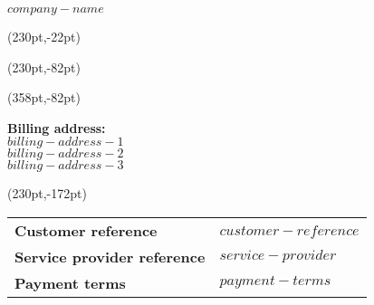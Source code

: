 \documentclass[a4paper,11pt]{article}
\begin{document}
\pagestyle{fancy}
\fancyhf{} %
\renewcommand{\headrulewidth}{0pt}
\renewcommand{\footrulewidth}{0pt}

\setlength{\fboxsep}{1.5em}
\setlength{\parindent}{0pt}

{\huge $company-name$}



\fancyput*(230pt,-22pt){}

\fancyput*(230pt,-82pt){}

\fancyput*(358pt,-82pt){}

\vspace{3em}
\textbf{Billing address:}\\[1em]
$billing-address-1$\\
$billing-address-2$\\
$billing-address-3$


\fancyput*(230pt,-172pt){%
    \begin{minipage}{85pt}
      \begin{tabular}{ll}
        \textbf{Customer reference}         & $customer-reference$\\
        \textbf{Service provider reference} & $service-provider$ \\
        \textbf{Payment terms}              & $payment-terms$
      \end{tabular}
    \end{minipage}}

\vspace{15em}


\renewcommand\arraystretch{1.5}
\setcounter{pos}{0}
\end{document}

